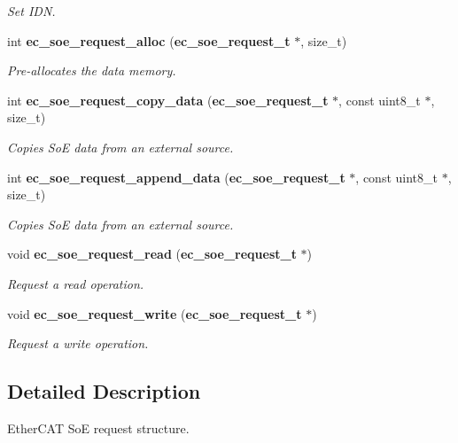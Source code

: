 \begin{DoxyCompactItemize}
\begin{DoxyCompactList}\small\item\em \-Set \-I\-D\-N. \end{DoxyCompactList}\item 
int {\bf ec\-\_\-soe\-\_\-request\-\_\-alloc} ({\bf ec\-\_\-soe\-\_\-request\-\_\-t} $\ast$, size\-\_\-t)
\begin{DoxyCompactList}\small\item\em \-Pre-\/allocates the data memory. \end{DoxyCompactList}\item 
int {\bf ec\-\_\-soe\-\_\-request\-\_\-copy\-\_\-data} ({\bf ec\-\_\-soe\-\_\-request\-\_\-t} $\ast$, const uint8\-\_\-t $\ast$, size\-\_\-t)
\begin{DoxyCompactList}\small\item\em \-Copies \-So\-E data from an external source. \end{DoxyCompactList}\item 
int {\bf ec\-\_\-soe\-\_\-request\-\_\-append\-\_\-data} ({\bf ec\-\_\-soe\-\_\-request\-\_\-t} $\ast$, const uint8\-\_\-t $\ast$, size\-\_\-t)
\begin{DoxyCompactList}\small\item\em \-Copies \-So\-E data from an external source. \end{DoxyCompactList}\item 
void {\bf ec\-\_\-soe\-\_\-request\-\_\-read} ({\bf ec\-\_\-soe\-\_\-request\-\_\-t} $\ast$)\label{soe__request_8h_a68954a5a60ba8dc64abb442be9481e67}

\begin{DoxyCompactList}\small\item\em \-Request a read operation. \end{DoxyCompactList}\item 
void {\bf ec\-\_\-soe\-\_\-request\-\_\-write} ({\bf ec\-\_\-soe\-\_\-request\-\_\-t} $\ast$)\label{soe__request_8h_a3aaef8f08907e15aad18c6b72995fec9}

\begin{DoxyCompactList}\small\item\em \-Request a write operation. \end{DoxyCompactList}\end{DoxyCompactItemize}


\subsection{\-Detailed \-Description}
\-Ether\-C\-A\-T \-So\-E request structure. 

